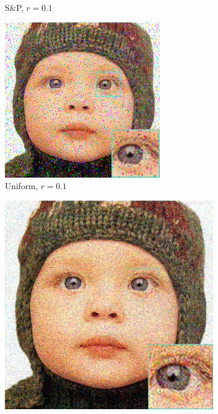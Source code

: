\begin{figure}
\begin{subfigure}{0.24\textwidth}
		\caption{S\&P, $r=0.1$}
	\end{subfigure}
	\begin{subfigure}{0.24\textwidth}
		\includegraphics[width=\textwidth]{images/exp1.1/uniform0.png}
		\caption{Uniform, $r=0.1$}
	\end{subfigure}
	\begin{subfigure}{0.24\textwidth}
		\includegraphics[width=\textwidth]{images/exp1.1/gaussian.png}

\end{subfigure}
\end{figure}
